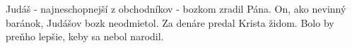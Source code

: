 Judáš - najneschopnejší z obchodníkov - bozkom zradil Pána. On, ako nevinný baránok, Judášov bozk neodmietol.
\versseparator
Za denáre predal Krista židom.
\versseparator
Bolo by preňho lepšie, keby sa nebol narodil.
